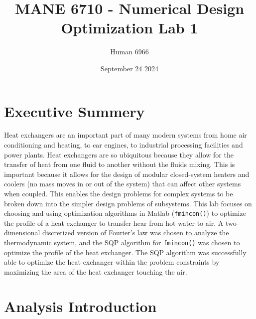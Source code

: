\documentclass[11pt]{article}%
\title{MANE 6710 - Numerical Design Optimization Lab 1}
\author{Human 6966}
\date{September 24 2024}
\begin{document}
\maketitle
\newpage
\tableofcontents
\newpage
{}
\section*{Executive Summery}
\label{sec:abstract}
Heat exchangers are an important part of many modern systems from home air conditioning and heating, to car engines, to industrial processing facilities and power plants. Heat exchangers are so ubiquitous because they allow for the transfer of heat from one fluid to another without the fluids mixing. This is important because it allows for the design of modular closed-system heaters and coolers (no mass moves in or out of the system) that can affect other systems when coupled. This enables the design problems for complex systems to be broken down into the simpler design problems of subsystems. This lab focuses on choosing and using optimization algorithms in Matlab (\lstinline{fmincon()}) to optimize the profile of a heat exchanger to transfer hear from hot water to air.  A two-dimensional discretized version of Fourier's law was chosen to analyze the thermodynamic system, and the SQP algorithm for \lstinline{fmincon()} was chosen to optimize the profile of the heat exchanger. The SQP algorithm was successfully able to optimize the heat exchanger within the problem constraints by maximizing the area of the heat exchanger touching the air.
\section{Analysis Introduction}
\label{sec:intro}
\end{document}
